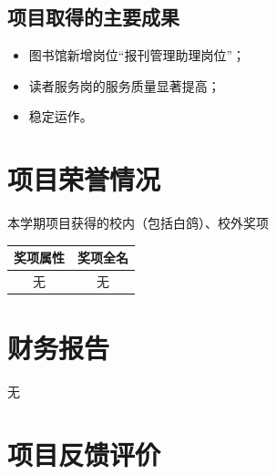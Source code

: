 \documentclass[nocover]{lizhechen}
\begin{document}
	\subsection{项目取得的主要成果}
	\begin{itemize}
		\item 图书馆新增岗位“报刊管理助理岗位”；
		\item 读者服务岗的服务质量显著提高；
		\item 稳定运作。
	\end{itemize}
	
	\section{项目荣誉情况}
	\par 本学期项目获得的校内（包括白鸽）、校外奖项
	\begin{table}[H]
		\begin{center}
		\begin{tabular}{|c|c|}
			\hline
			奖项属性 & 奖项全名 \\
			\hline
			无 & 无 \\
			\hline
		\end{tabular}
		\end{center}
	\end{table}
	
	\section{财务报告}
	无
	
	\section{项目反馈评价}
	
\end{document}
